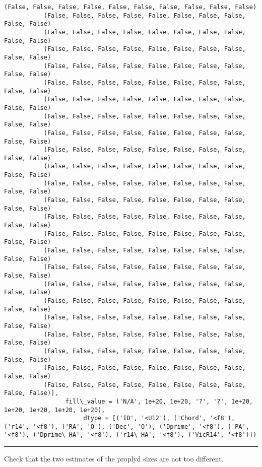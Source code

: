 \documentclass{article}
\begin{document}
\begin{Verbatim}[commandchars=\\\{\}]
           (False, False, False, False, False, False, False, False, False, False)
           (False, False, False, False, False, False, False, False, False, False)
           (False, False, False, False, False, False, False, False, False, False)
           (False, False, False, False, False, False, False, False, False, False)
           (False, False, False, False, False, False, False, False, False, False)
           (False, False, False, False, False, False, False, False, False, False)
           (False, False, False, False, False, False, False, False, False, False)
           (False, False, False, False, False, False, False, False, False, False)
           (False, False, False, False, False, False, False, False, False, False)
           (False, False, False, False, False, False, False, False, False, False)
           (False, False, False, False, False, False, False, False, False, False)
           (False, False, False, False, False, False, False, False, False, False)
           (False, False, False, False, False, False, False, False, False, False)
           (False, False, False, False, False, False, False, False, False, False)
           (False, False, False, False, False, False, False, False, False, False)
           (False, False, False, False, False, False, False, False, False, False)
           (False, False, False, False, False, False, False, False, False, False)
           (False, False, False, False, False, False, False, False, False, False)
           (False, False, False, False, False, False, False, False, False, False)
           (False, False, False, False, False, False, False, False, False, False)
           (False, False, False, False, False, False, False, False, False, False)
           (False, False, False, False, False, False, False, False, False, False)
           (False, False, False, False, False, False, False, False, False, False)
           (False, False, False, False, False, False, False, False, False, False)],
                 fill\_value = ('N/A', 1e+20, 1e+20, '?', '?', 1e+20, 1e+20, 1e+20, 1e+20, 1e+20),
                      dtype = [('ID', '<U12'), ('Chord', '<f8'), ('r14', '<f8'), ('RA', 'O'), ('Dec', 'O'), ('Dprime', '<f8'), ('PA', '<f8'), ('Dprime\_HA', '<f8'), ('r14\_HA', '<f8'), ('VicR14', '<f8')])
\end{Verbatim}
        
    \begin{center}\rule{3in}{0.4pt}\end{center}

Check that the two estimates of the proplyd sizes are not too different.
\end{document}
